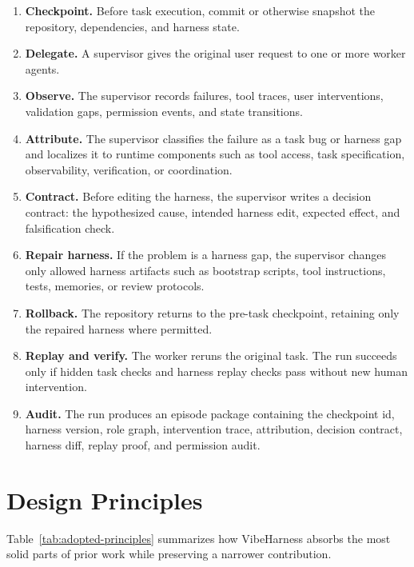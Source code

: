 \documentclass[11pt]{article}
\begin{document}
\begin{enumerate}[leftmargin=*]
  \item \textbf{Checkpoint.} Before task execution, commit or otherwise snapshot
  the repository, dependencies, and harness state.
  \item \textbf{Delegate.} A supervisor gives the original user request to one or
  more worker agents.
  \item \textbf{Observe.} The supervisor records failures, tool traces, user
  interventions, validation gaps, permission events, and state transitions.
  \item \textbf{Attribute.} The supervisor classifies the failure as a task bug
  or harness gap and localizes it to runtime components such as tool access,
  task specification, observability, verification, or coordination.
  \item \textbf{Contract.} Before editing the harness, the supervisor writes a
  decision contract: the hypothesized cause, intended harness edit, expected
  effect, and falsification check.
  \item \textbf{Repair harness.} If the problem is a harness gap, the supervisor
  changes only allowed harness artifacts such as bootstrap scripts, tool
  instructions, tests, memories, or review protocols.
  \item \textbf{Rollback.} The repository returns to the pre-task checkpoint,
  retaining only the repaired harness where permitted.
  \item \textbf{Replay and verify.} The worker reruns the original task. The run
  succeeds only if hidden task checks and harness replay checks pass without new
  human intervention.
  \item \textbf{Audit.} The run produces an episode package containing the
  checkpoint id, harness version, role graph, intervention trace, attribution,
  decision contract, harness diff, replay proof, and permission audit.
\end{enumerate}

\section{Design Principles}

Table~\ref{tab:adopted-principles} summarizes how VibeHarness absorbs the most
solid parts of prior work while preserving a narrower contribution.
\end{document}
